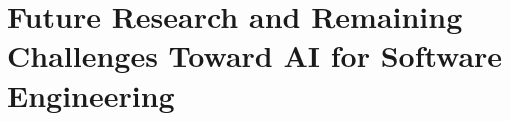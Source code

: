 \chapter{Future Research and Remaining Challenges Toward AI for Software Engineering}
\label{chap:position-paper}


